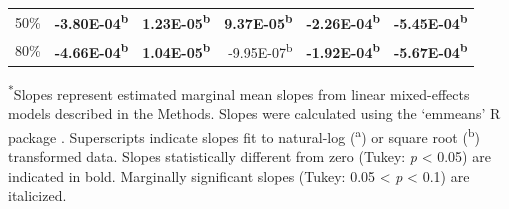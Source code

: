 \begin{landscape}
\begin{table}
{\begin{tabular}{p{2cm}p{3cm}p{3cm}p{3cm}p{3cm}p{3cm}}
            \multicolumn{1}{r}{50\%}
            &  \multicolumn{1}{r}{\textbf{-3.80E-04\textsuperscript{b}}}
            &  \multicolumn{1}{r}{\textbf{ 1.23E-05\textsuperscript{b}}}
            &  \multicolumn{1}{r}{\textbf{ 9.37E-05\textsuperscript{b}}}
            &  \multicolumn{1}{r}{\textbf{-2.26E-04\textsuperscript{b}}}
            &  \multicolumn{1}{r}{\textbf{-5.45E-04\textsuperscript{b}}}
            \\
              
            \multicolumn{1}{r}{80\%}
            &  \multicolumn{1}{r}{\textbf{-4.66E-04\textsuperscript{b}}}
            &  \multicolumn{1}{r}{\textbf{ 1.04E-05\textsuperscript{b}}}
            &  \multicolumn{1}{r}{-9.95E-07\textsuperscript{b}}
            &  \multicolumn{1}{r}{\textbf{-1.92E-04\textsuperscript{b}}}
            &  \multicolumn{1}{r}{\textbf{-5.67E-04\textsuperscript{b}}}  
            \\
            \hline
        \end{tabular}}
        \label{tab:table2.3}
    \end{table}
    \noindent \textsuperscript{*}Slopes represent estimated marginal mean slopes from linear mixed-effects models described in the Methods. Slopes were calculated using the ‘emmeans’ R package . Superscripts indicate slopes fit to natural-log (\textsuperscript{a}) or square root (\textsuperscript{b}) transformed data. Slopes statistically different from zero (Tukey: \textit{p} < 0.05) are indicated in bold. Marginally significant slopes (Tukey: 0.05 < \textit{p} < 0.1) are italicized.
\end{landscape}
\clearpage

